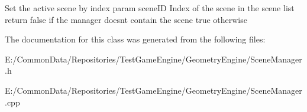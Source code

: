 Set the active scene by index param scene\+ID Index of the scene in the scene list return false if the manager doesn\textquotesingle{}t contain the scene true otherwise 

The documentation for this class was generated from the following files\+:\begin{DoxyCompactItemize}
\item 
E\+:/\+Common\+Data/\+Repositories/\+Test\+Game\+Engine/\+Geometry\+Engine/Scene\+Manager.\+h\item 
E\+:/\+Common\+Data/\+Repositories/\+Test\+Game\+Engine/\+Geometry\+Engine/Scene\+Manager.\+cpp\end{DoxyCompactItemize}

